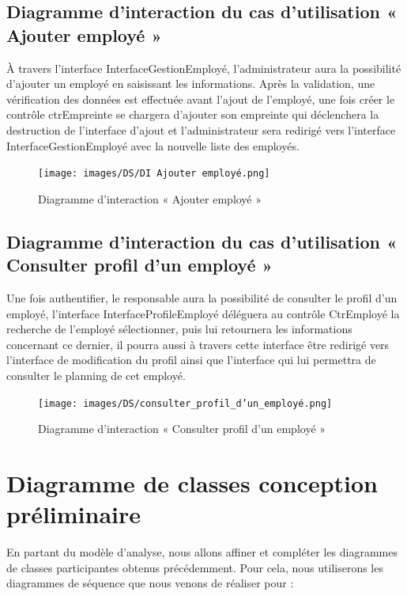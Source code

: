 \subsection*{Diagramme d'interaction du cas d'utilisation « Ajouter employé »}
À travers l’interface InterfaceGestionEmployé, l’administrateur aura la 
possibilité d’ajouter un employé en saisissant les informations. Après la 
validation, une vérification des données est effectuée avant l’ajout de 
l’employé, une fois créer le contrôle ctrEmpreinte se chargera d’ajouter son 
empreinte qui déclenchera la destruction de l’interface d’ajout et 
l’administrateur sera redirigé vers l’interface InterfaceGestionEmployé avec la 
nouvelle liste des employés.

\clearpage

\begin{figure}[h!]
    \centering
    \texttt{[image: images/DS/DI Ajouter employé.png]}
    \caption{Diagramme d'interaction « Ajouter employé »}
    \label{fig41}
\end{figure}


\subsection*{Diagramme d'interaction du cas d'utilisation « Consulter profil d'un employé »}
Une fois authentifier, le responsable aura la possibilité de consulter le profil 
d’un employé, l’interface InterfaceProfileEmployé déléguera au contrôle 
CtrEmployé la recherche de l’employé sélectionner, puis lui retournera les 
informations concernant ce dernier, il pourra aussi à travers cette interface 
être redirigé vers l’interface de modification du profil ainsi que l’interface 
qui lui permettra de consulter le planning de cet employé.
        
\clearpage
        
\begin{figure}[h!]
    \centering
    \texttt{[image: images/DS/consulter\_profil\_d'un\_employé.png]}
    \caption{Diagramme d'interaction « Consulter profil d'un employé »}
    \label{fig42}
\end{figure}
    
\section{Diagramme de classes conception préliminaire}
En partant du modèle d’analyse, nous allons affiner et compléter les diagrammes 
de classes participantes obtenus précédemment. Pour cela, nous utiliserons les 
diagrammes de séquence que nous venons de réaliser pour :


